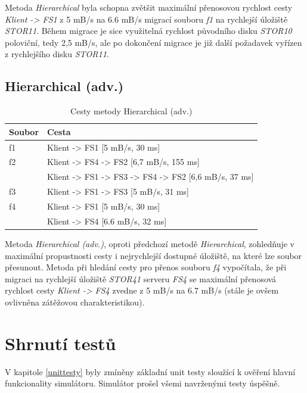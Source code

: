 \documentclass[czech,DP]{thesiskiv}
\begin{document}
Metoda \textit{Hierarchical} byla schopna zvětšit maximální přenosovou rychlost cesty \textit{Klient -> FS1} z 5 mB/s na 6.6 mB/s migrací souboru \textit{f1} na rychlejší úložiště \textit{STOR11}. Během migrace je sice využitelná rychlost původního disku \textit{STOR10} poloviční, tedy 2,5 mB/s, ale po dokončení migrace je již další požadavek vyřízen z rychlejšího disku \textit{STOR11}.

\subsection{Hierarchical (adv.)}

\begin{table}[H]
\centering
\caption{Cesty metody Hierarchical (adv.)}
\begin{tabular}{|l|l|}
\hline
\textbf{Soubor} & \textbf{Cesta}           \\ \hline
f1              & Klient -> FS1 [5 mB/s, 30 ms]\\ \hline
f2              & Klient -> FS4 -> FS2 [6,7 mB/s, 155 ms]\\ \hline
                 & Klient -> FS1 -> FS3 -> FS4 -> FS2 [6,6 mB/s, 37 ms]\\ \hline
f3              & Klient -> FS1 -> FS3 [5 mB/s, 31 ms]\\ \hline
f4              & Klient -> FS1 [5 mB/s, 30 ms]\\ \hline
                 & Klient -> FS4 [6.6 mB/s, 32 ms]\\ \hline

\end{tabular}
\end{table}

Metoda \textit{Hierarchical (adv.)}, oproti předchozí metodě \textit{Hierarchical}, zohledňuje v maximální propustnosti cesty i nejrychlejší dostupné úložiště, na které lze soubor přesunout. Metoda při hledání cesty pro přenos souboru \textit{f4} vypočítala, že při migraci na rychlejší úložiště \textit{STOR41} serveru \textit{FS4} se maximální přenosová rychlost cesty \textit{Klient -> FS4} zvedne z 5 mB/s na 6.7 mB/s (stále je ovšem ovlivněna zátěžovou charakteristikou).

\section{Shrnutí testů}

V kapitole \ref{unittesty} byly zmíněny základní unit testy sloužící k ověření hlavní funkcionality simulátoru. Simulátor prošel všemi navrženými testy úspěšně. 
\end{document}

